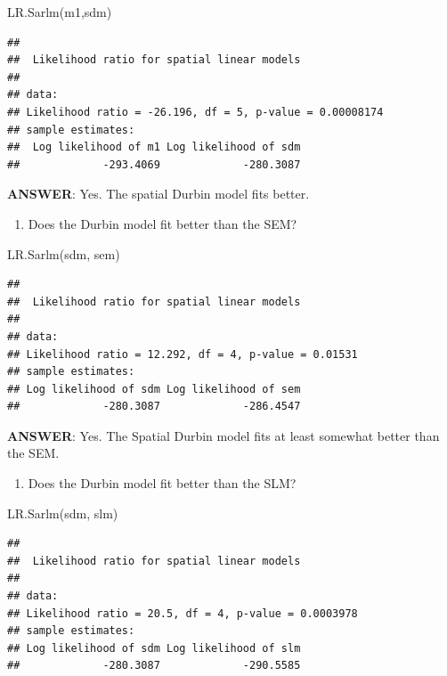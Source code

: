\documentclass[
]{book}
\newenvironment{Shaded}{\begin{snugshade}}{\end{snugshade}}
\newcommand{\FunctionTok}[1]{\textcolor[rgb]{0.00,0.00,0.00}{#1}}
\newcommand{\NormalTok}[1]{#1}
\providecommand{\tightlist}{%
  \setlength{\itemsep}{0pt}\setlength{\parskip}{0pt}}
\begin{document}
\begin{Shaded}
\begin{Highlighting}[]
\FunctionTok{LR.Sarlm}\NormalTok{(m1,sdm)}
\end{Highlighting}
\end{Shaded}

\begin{verbatim}
## 
##  Likelihood ratio for spatial linear models
## 
## data:  
## Likelihood ratio = -26.196, df = 5, p-value = 0.00008174
## sample estimates:
##  Log likelihood of m1 Log likelihood of sdm 
##             -293.4069             -280.3087
\end{verbatim}

\textbf{ANSWER}: Yes. The spatial Durbin model fits better.

\begin{enumerate}
\def\labelenumi{\arabic{enumi}.}
\setcounter{enumi}{1}
\tightlist
\item
  Does the Durbin model fit better than the SEM?
\end{enumerate}

\begin{Shaded}
\begin{Highlighting}[]
\FunctionTok{LR.Sarlm}\NormalTok{(sdm, sem)}
\end{Highlighting}
\end{Shaded}

\begin{verbatim}
## 
##  Likelihood ratio for spatial linear models
## 
## data:  
## Likelihood ratio = 12.292, df = 4, p-value = 0.01531
## sample estimates:
## Log likelihood of sdm Log likelihood of sem 
##             -280.3087             -286.4547
\end{verbatim}

\textbf{ANSWER}: Yes. The Spatial Durbin model fits at least somewhat better than the SEM.

\begin{enumerate}
\def\labelenumi{\arabic{enumi}.}
\setcounter{enumi}{2}
\tightlist
\item
  Does the Durbin model fit better than the SLM?
\end{enumerate}

\begin{Shaded}
\begin{Highlighting}[]
\FunctionTok{LR.Sarlm}\NormalTok{(sdm, slm)}
\end{Highlighting}
\end{Shaded}

\begin{verbatim}
## 
##  Likelihood ratio for spatial linear models
## 
## data:  
## Likelihood ratio = 20.5, df = 4, p-value = 0.0003978
## sample estimates:
## Log likelihood of sdm Log likelihood of slm 
##             -280.3087             -290.5585
\end{verbatim}
\end{document}
